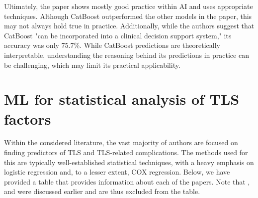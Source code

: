 \documentclass{article}
\begin{document}
Ultimately, the paper shows mostly good practice within AI and uses appropriate techniques.  Although CatBoost outperformed the other models in the paper, this may not always hold true in practice. Additionally, while the authors suggest that CatBoost "can be incorporated into a clinical decision support system," its accuracy was only 75.7\%. While CatBoost predictions are theoretically interpretable, understanding the reasoning behind its predictions in practice can be challenging, which may limit its practical applicability.

\section{ML for statistical analysis of TLS factors}


Within the considered literature, the vast majority of authors are focused on finding predictors of TLS and TLS-related complications. The methods used for this are typically well-established statistical techniques, with a heavy emphasis on logistic regression and, to a lesser extent, COX regression. Below, we have provided a table that provides information about each of the papers. Note that \cite{montesinos2008tumor}, 
\cite{mato2004predictive} and  \cite{xiao2024prediction} were discussed earlier and are thus excluded from the table.
\end{document}
